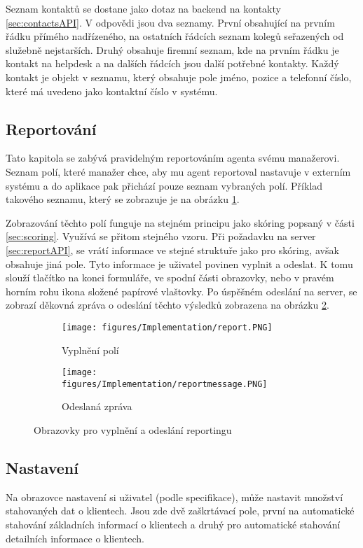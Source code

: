 \documentclass[11pt,twoside,a4paper]{book}
\begin{document}
Seznam kontaktů se dostane jako dotaz na backend na kontakty \ref{sec:contactsAPI}. V odpovědi jsou dva seznamy. První obsahující na prvním řádku přímého nadřízeného, na ostatních řádcích seznam kolegů seřazených od služebně nejstarších. Druhý obsahuje firemní seznam, kde na prvním řádku je kontakt na helpdesk a na dalších řádcích jsou další potřebné kontakty. Každý kontakt je objekt v seznamu, který obsahuje pole jméno, pozice a telefonní číslo, které má uvedeno jako kontaktní číslo v systému.

\subsection{Reportování}
Tato kapitola se zabývá pravidelným reportováním agenta svému manažerovi. Seznam polí, které manažer chce, aby mu agent reportoval nastavuje v externím systému a do aplikace pak přichází pouze seznam vybraných polí. Příklad takového seznamu, který se zobrazuje je na obrázku \ref{fig:reportscreensImplementa}.

Zobrazování těchto polí funguje na stejném principu jako skóring popsaný v části \ref{sec:scoring}. Využívá se přitom stejného vzoru. Při požadavku na server \ref{sec:reportAPI}, se vrátí informace ve stejné struktuře jako pro skóring, avšak obsahuje jiná pole. Tyto informace je uživatel povinen vyplnit a odeslat. K tomu slouží tlačítko na konci formuláře, ve spodní části obrazovky, nebo v pravém horním rohu ikona složené papírové vlaštovky. Po úspěšném odeslání na server, se zobrazí děkovná zpráva o odeslání těchto výsledků zobrazena na obrázku \ref{fig:reportscreensImplementb}.

\begin{figure}[H]
	\centering
	\begin{subfigure}{.4\textwidth}
	  	\centering
	  	\texttt{[image: figures/Implementation/report.PNG]}
	  	\caption{Vyplnění polí}
	  	\label{fig:reportscreensImplementa}
	\end{subfigure}
	\begin{subfigure}{.4\textwidth}
	  	\centering
		\texttt{[image: figures/Implementation/reportmessage.PNG]}
	  	\caption{Odeslaná zpráva}
	  	\label{fig:reportscreensImplementb}
	\end{subfigure}
\caption{Obrazovky pro vyplnění a odeslání reportingu}
\label{fig:reportscreensImplement}
\end{figure}

\subsection{Nastavení}
Na obrazovce nastavení si uživatel (podle specifikace), může nastavit množství stahovaných dat o klientech. Jsou zde dvě zaškrtávací pole, první na automatické stahování základních informací o klientech a druhý pro automatické stahování detailních informace o klientech.
\end{document}
